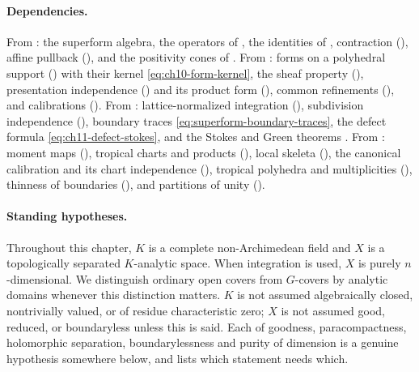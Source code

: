 \paragraph{Dependencies.}
From : the superform algebra, the operators of
, the identities of
, contraction
(), affine pullback
(), and the positivity cones of
.  From : forms on a
polyhedral support () with their kernel
\eqref{eq:ch10-form-kernel}, the sheaf property
(), presentation independence
() and its product form
(), common refinements
(), and calibrations
().  From :
lattice-normalized integration (), subdivision
independence (), boundary traces
\eqref{eq:superform-boundary-traces}, the defect formula
\eqref{eq:ch11-defect-stokes}, and the Stokes and Green theorems
.  From
: moment maps
(), tropical charts and products
(), local skeleta
(), the
canonical calibration and its chart independence
(),
tropical polyhedra and multiplicities
(), thinness
of boundaries (),
and partitions of unity ().

\paragraph{Standing hypotheses.}
Throughout this chapter, $K$ is a complete non-Archimedean field and $X$ is a
topologically separated $K$-analytic space.  When integration is used, $X$ is
purely $n$-dimensional.  We distinguish ordinary open covers from
$G$-covers by analytic domains whenever this distinction matters.
$K$ is not assumed algebraically closed, nontrivially valued, or of residue
characteristic zero; $X$ is not assumed good, reduced, or boundaryless unless
this is said.  Each of goodness, paracompactness, holomorphic separation,
boundarylessness and purity of dimension is a genuine hypothesis somewhere
below, and  lists which statement needs which.

